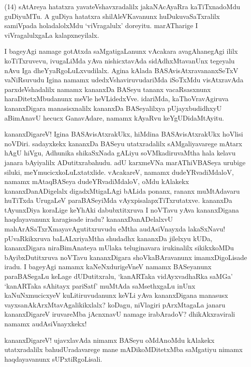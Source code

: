 \documentclass[11pt,a4size]{article}
\begin{document}
(14) sAtAreya hatatxra yavateVshavxradalilx jakaNAcAyaRra
     kaTiTxnadoMdu guDiyuMTu. A guDiya hatatxra shilAleVKavanunx
     huDukuvaSaTxralilx samiVpada holadalolxMdu `viVragalulx'
     doreyitu. marATharige I viVragalulxgaLa kalapxneyilalx.

I bageyAgi namage gotAtxda saMgatigaLanunx vAcakara avagAhanegAgi
ililx koTiTxruvevu, ivugaLiMda yAva nishicxtavAda sidAdhxMtavanUnx
tegeyalu nAvu Iga dheYyaRgoLuLxvudilalx. Agina kAlada
BASAvisAtxravananxSeTxV vaNiRsuvudu Igina namamx
udedxVshaviruvudariMda iSoTxMdu visAtxravAda parxdeVshadalilx namamx
kananxDa BASeyu tananx vacaRsasxnunx haraDitetxMbudanunx meVle
heVLidedxVve. idariMda, kaThoVravAgiruva kananxDigara manasisxnalilx
kananxDa BASeyalilxya pUjayxbudidhxyU aBimAnavU hecucx GanavAdare,
namamx kAyaRvu keYgUDidaMtAyitu.

kananxDigareV! Igina BASAvisAtxrakUkx, hiMdina BASAvisAtxrakUkx
hoVlisi noVDiri. sadayxkekx kananxDa BASeyu utatxradalilx
sAMgaliyavarege 
mAtarx hAgU hiVgu, Adhunika shikaSxNada gALiyu soVMkadiruvaMtha
hala kelavu janara bAyiyalilx ADutitxrabahudu. adU karxmeVNa
marAThiVBASeya urubige siluki, meYmucicxkoLuLxtatxlide. vAcakareV,
namamx dudeYRvadiMdaloV, namamx mAtaqBASeya dudeYRvadiMdaloV, oMdu
kAlakekx kananxDanADigelalx digadxMtigaLAgi bALida ponanx, rananx
muMtAdavaru huTiTxda UrugaLeV paraBASeyiMda
vAyxpisalapxTiTxrutatxve. kananxDa tAyunxDiya koraLige
keYhAki dabubxtitxruva I noVTavu yAva kananxDigana haqdayavanunx
karagisade iradu? kananxDanADelalxvU mahArASaTxrXmayavAgutitxruvudu
eMtha audAsiVnayxda lakaSxNavu! pUvaRkikxruva baLALxriyaMtha shudadhx
kananxDa jilelxyu kUDa, kananxDigara niraBimAnateya mUlaka
teluginavara irukinalilx sikikxkoMDu bAyibxDutitxruva noVTavu
kananxDigara shoVkaBAravanunx imamxDigoLisade iradu. I bageyAgi namamx
kaNeNxdurigeVneV namamx BASeyanunx paraBASegaLu keLage dUDutitxralu,
`kanARTaka vidAyxvadhaRka saMGa' `kanARTaka sAhitayx pariSatf' muMtAda
saMsethxgaLu inUnx kaNuNxmucicxyeV kuLitiruvudanunx keVLi yAva
kananxDigana manasusx vayxsanAkArxMtavAgalikikxlalx? koDagu, niVlagiri
pArxMtagaLa janaru kananxDigareV iruvareMba jAcnxnavU namage
irabAradoV? dhikAkxravirali namamx audAsiVnayxkekx!

kananxDigareV! ujavxlavAda nimamx BASeyu oMdAnoMdu kAlakekx
utatxradalilx bahudUradavarege mane mADikoMDitetxMba saMgatiyu nimamx
haqdayavanunx sUPxtiRgoLisali.

\bigskip
\end{document}
